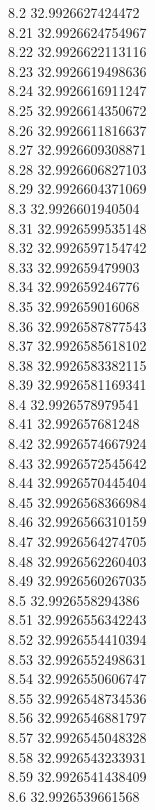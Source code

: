 {8.2	32.9926627424472\\
8.21	32.9926624754967\\
8.22	32.9926622113116\\
8.23	32.9926619498636\\
8.24	32.9926616911247\\
8.25	32.9926614350672\\
8.26	32.9926611816637\\
8.27	32.9926609308871\\
8.28	32.9926606827103\\
8.29	32.9926604371069\\
8.3	32.9926601940504\\
8.31	32.9926599535148\\
8.32	32.9926597154742\\
8.33	32.992659479903\\
8.34	32.992659246776\\
8.35	32.992659016068\\
8.36	32.9926587877543\\
8.37	32.9926585618102\\
8.38	32.9926583382115\\
8.39	32.9926581169341\\
8.4	32.9926578979541\\
8.41	32.992657681248\\
8.42	32.9926574667924\\
8.43	32.9926572545642\\
8.44	32.9926570445404\\
8.45	32.9926568366984\\
8.46	32.9926566310159\\
8.47	32.9926564274705\\
8.48	32.9926562260403\\
8.49	32.9926560267035\\
8.5	32.9926558294386\\
8.51	32.9926556342243\\
8.52	32.9926554410394\\
8.53	32.9926552498631\\
8.54	32.9926550606747\\
8.55	32.9926548734536\\
8.56	32.9926546881797\\
8.57	32.9926545048328\\
8.58	32.9926543233931\\
8.59	32.9926541438409\\
8.6	32.9926539661568\\
}
